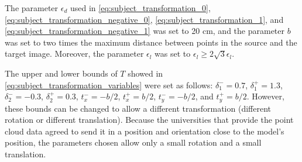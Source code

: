         The parameter $\epsilon_d$ used in \autoref{eq:subject_transformation_0}, \autoref{eq:subject_transformation_negative_0}, \autoref{eq:subject_transformation_1}, and \autoref{eq:subject_transformation_negative_1}
        was set to 20 cm, and the parameter $b$ was set to two times the maximum distance between points in the source and the target image.
        Moreover, the parameter $\epsilon_l$ was set to $\epsilon_l \geq 2 \sqrt{3} \epsilon_l$. 
        
        The upper and lower bounds of $T$ showed in \autoref{eq:subject_transformation_variables} were set as follows: 
        $\delta_1^- = 0.7$, $\delta_1^+ = 1.3$, $\delta_2^- = -0.3$, $\delta_2^+ = 0.3$, $t_x^- = -b / 2$, $t_x^+ = b / 2$, $t_y^- = -b / 2$, and $t_y^+ = b / 2$.
        However, these bounds can be changed to allow a different transformation (different rotation or different translation).
        Because the universities that provide the point cloud data agreed to send it in a position and orientation close to the model’s position, the parameters chosen allow only a small rotation and a small translation.



